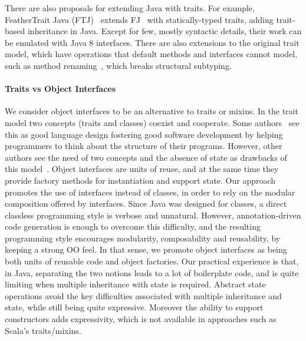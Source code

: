 There are also proposals for extending Java with traits. For
example, FeatherTrait Java (FTJ)~\cite{Liquori08ftj} extends
FJ~\cite{Igarashi01FJ} with statically-typed traits, adding trait-based
inheritance in Java.  Except for few, mostly syntactic details, their work can
be emulated with Java 8 interfaces. There are also extensions to the original
trait model, which have operations that default methods and interfaces cannot
model, such as method renaming~\cite{reppy2006foundation}, which breaks
structural subtyping.

\paragraph{Traits vs Object Interfaces}
We consider object interfaces to be an alternative to traits or mixins.  In the
trait model two concepts (traits and classes) coexist and cooperate. Some
authors~\cite{BettiniDSS13} see this as good language design fostering good
software development by helping programmers to think about the structure of
their programs.  However, other authors see the need of two concepts and the
absence of state as drawbacks of this model~\cite{malayeri2009cz}.  Object
interfaces are units of reuse, and at the same time they provide factory methods
for instantiation and support state.  Our approach promotes the use of
interfaces instead of classes, in order to rely on the modular composition
offered by interfaces. Since Java was designed for classes, a direct classless
programming style is verbose and unnatural. However, annotation-driven code
generation is enough to overcome this difficulty, and the resulting programming
style encourages modularity, composability and reusability, by keeping a strong
OO feel. In that sense, we promote object interfaces as being both units of
reusable code and object factories. Our practical experience is that, in Java,
separating the two notions leads to a lot of boilerplate code, and is quite
limiting when multiple inheritance with state is required.  Abstract state
operations avoid the key difficulties associated with multiple inheritance and
state, while still being quite expressive.  Moreover the ability to support
constructors adds expressivity, which is not available in approaches
such as Scala's traits/mixins.


